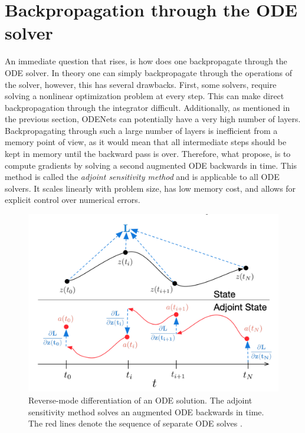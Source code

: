 \section{Backpropagation through the ODE solver}
\label{section:ode:backpropagation}

An immediate question that rises, is how does one backpropagate through the ODE solver. In theory one can simply backpropagate through the operations of the solver, however, this has several drawbacks. First, some solvers, require solving a nonlinear optimization problem at every step. This can make direct backpropagation through the integrator difficult. Additionally, as mentioned in the previous section, ODENets can potentially have a very high number of layers. Backpropagating through such a large number of layers is inefficient from a memory point of view, as it would mean that all intermediate steps should be kept in memory until the backward pass is over. Therefore, what \citet{chen2018neural} propose, is to compute gradients by solving a second augmented ODE backwards in time. This method is called the \emph{adjoint sensitivity method} \citep{pontryagin2018mathematical} and is applicable to all ODE solvers. It scales linearly with problem size, has low memory cost, and allows for explicit control over numerical errors.

\begin{figure}[ht]
      \centering
      \includegraphics[width=\columnwidth]{figures/adjoint_method.png}
      \caption{Reverse-mode differentiation of an ODE solution. The adjoint sensitivity method solves an augmented ODE backwards in time. The red lines denote the sequence of separate ODE solves \cite{chen2018neural}.}
      \label{ode:adjoint}
\end{figure}

